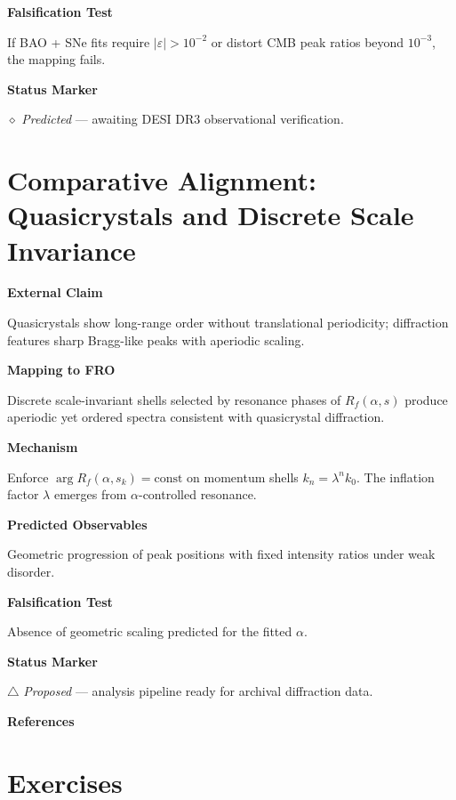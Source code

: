 \textbf{Falsification Test}

If BAO + SNe fits require $|\varepsilon|>10^{-2}$ or distort CMB peak ratios beyond $10^{-3}$, the mapping fails.

\textbf{Status Marker}

$\diamond$ \textit{Predicted} --- awaiting DESI DR3 observational verification.

\section{Comparative Alignment: Quasicrystals and Discrete Scale Invariance}

\textbf{External Claim}

Quasicrystals show long-range order without translational periodicity; diffraction features sharp Bragg-like peaks with aperiodic scaling.

\textbf{Mapping to FRO}

Discrete scale-invariant shells selected by resonance phases of $R_f(\alpha,s)$ produce aperiodic yet ordered spectra consistent with quasicrystal diffraction.

\textbf{Mechanism}

Enforce $\arg R_f(\alpha,s_k)=\text{const}$ on momentum shells $k_n=\lambda^n k_0$. The inflation factor $\lambda$ emerges from $\alpha$-controlled resonance.

\textbf{Predicted Observables}

Geometric progression of peak positions with fixed intensity ratios under weak disorder.

\textbf{Falsification Test}

Absence of geometric scaling predicted for the fitted $\alpha$.

\textbf{Status Marker}

$\triangle$ \textit{Proposed} --- analysis pipeline ready for archival diffraction data.

\textbf{References}

\cite{shechtman1984metallic,senechal1995quasicrystals}

\section*{Exercises}

